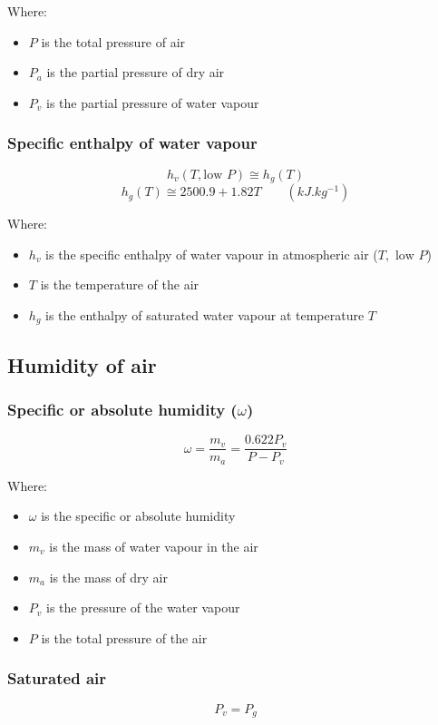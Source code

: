 \documentclass[11pt]{article}
\begin{document}
Where:
\begin{itemize}
\item \(P\) is the total pressure of air
\item \(P_a\) is the partial pressure of dry air
\item \(P_v\) is the partial pressure of water vapour
\end{itemize}
\subsubsection{Specific enthalpy of water vapour}
\label{sec:org846f377}
\[h_v (T, \text{low } P) \cong h_g (T)\]
\[h_g (T) \cong 2500.9 + 1.82T \qquad (\unit{kJ.kg^{-1}})\]

Where:
\begin{itemize}
\item \(h_v\) is the specific enthalpy of water vapour in atmospheric air (\(T, \text{ low } P\))
\item \(T\) is the temperature of the air
\item \(h_g\) is the enthalpy of saturated water vapour at temperature \(T\)
\end{itemize}
\subsection{Humidity of air}
\label{sec:org95320ef}

\subsubsection{Specific or absolute humidity (\(\omega\))}
\label{sec:org7b42b16}
\[\omega = \frac{m_v}{m_a} = \frac{0.622 P_v}{P - P_v}\]

Where:
\begin{itemize}
\item \(\omega\) is the specific or absolute humidity
\item \(m_v\) is the mass of water vapour in the air
\item \(m_a\) is the mass of dry air
\item \(P_v\) is the pressure of the water vapour
\item \(P\) is the total pressure of the air
\end{itemize}
\subsubsection{Saturated air}
\label{sec:org5284e5e}
\[P_v = P_g\]
\end{document}
